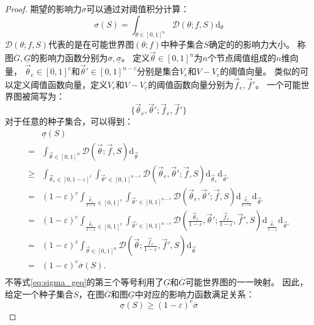 \begin{proof}
期望的影响力$\sigma$可以通过对阈值积分计算：
$$\sigma(S)=\int_{\mathbb{\theta}\in[0,1]^n} \mathcal{D}(\mathbb{\theta};f,S) \mbox{d}_{\mathbb{\theta}}$$
$\mathcal{D}(\mathbb{\theta};f,S)$代表的是在可能世界图$(\mathbb{\theta};f)$中种子集合$S$确定的的影响力大小。
称图$\overline{G},\underline{G}$的影响力函数分别为$\overline{\sigma},\underline{\sigma}$。
定义$\vec{\theta}\in[0,1]^n$为$n$个节点阈值组成的$n$维向量，
$\vec{\theta}_e \in[0,1]^{c}$和$\vec{\theta}'\in[0,1]^{n-c}$分别是集合$V_e$和$V-V_e$的阈值向量。
类似的可以定义阈值函数向量，定义$V_e$和$V-V_e$的阈值函数向量分别为$\vec{f}_e,\vec{f}'$。
一个可能世界图被简写为：
$$\{\vec{\theta}_e,\vec{\theta}';\vec{f}_e,\vec{f}'\}$$
对于任意的种子集合，可以得到：
\begin{equation}
\label{eq:sigma_geq}
\begin{array}{ll}
&\underline{\sigma}(S)\\
=&\int_{\vec{\theta}\in[0,1]^n} \mathcal{D}(\vec{\theta};\vec{f},S) \mbox{d}_{\vec{\theta}} \\
\geq&\int_{\vec{\theta}_e\in[0,1-\varepsilon]^c}\int_{\vec{\theta}'\in[0,1]^{n-c}} \mathcal{D}(\vec{\theta}_e,\vec{\theta}';\vec{f},S) \mbox{d}_{\vec{\theta}_e}\mbox{d}_{\vec{\theta}'} \\
=&(1-\varepsilon)^c \int_{\frac{\vec{\theta}_e}{1-\varepsilon}\in[0,1]^c}\int_{\vec{\theta}'\in[0,1]^{n-c}} \mathcal{D}(\vec{\theta}_e,\vec{\theta}';\vec{f},S) \mbox{d}_{\frac{\vec{\theta}_e}{1-\varepsilon}}\mbox{d}_{\vec{\theta}'} \\
=&(1-\varepsilon)^c \int_{\frac{\vec{\theta}_e}{1-\varepsilon}\in[0,1]^c}\int_{\vec{\theta}'\in[0,1]^{n-c}} \mathcal{D}(\frac{\vec{\theta}_e}{1-\varepsilon},\vec{\theta}';\frac{\vec{f}_e}{1-\varepsilon},\vec{f}',S) \mbox{d}_{\frac{\vec{\theta}_e}{1-\varepsilon}}\mbox{d}_{\vec{\theta}'} \\
=&(1-\varepsilon)^c \int_{\vec{\theta}\in[0,1]^n} \mathcal{D}(\vec{\theta};\frac{\vec{f}_e}{1-\varepsilon},\vec{f}',S) \mbox{d}_{\vec{\theta}} \\
=&(1-\varepsilon)^c \overline{\sigma}(S).\\
\end{array}
\end{equation}
不等式\ref{eq:sigma_geq}的第三个等号利用了$\underline{G}$和$\overline{G}$可能世界图的一一映射。
因此，给定一个种子集合$S$，在图$\overline{G}$和图$\underline{G}$中对应的影响力函数满足关系：
$$\underline{\sigma}(S) \geq (1-\varepsilon)^c \overline{\sigma}$$




\end{proof}
